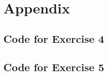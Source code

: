 \documentclass[12pt]{article}
\begin{document}
\section*{Appendix}\label{appendix}
\subsection*{Code for Exercise 4}

\subsection*{Code for Exercise 5}

% 
% 
\end{document}

